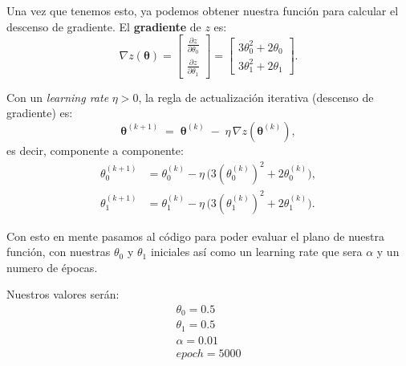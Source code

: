 \documentclass{iopjournal}
\begin{document}
Una vez que tenemos esto, ya podemos obtener nuestra función para calcular el descenso de gradiente.
El \textbf{gradiente} de $z$ es:
\begin{equation}
\nabla z(\boldsymbol{\theta}) =
\begin{bmatrix}
\frac{\partial z}{\partial \theta_0} \\
\frac{\partial z}{\partial \theta_1}
\end{bmatrix}
=
\begin{bmatrix}
3\theta_0^2 + 2\theta_0 \\
3\theta_1^2 + 2\theta_1
\end{bmatrix}.
\label{eq:grad}
\end{equation}

Con un \textit{learning rate} $\eta>0$, la regla de actualización iterativa (descenso de gradiente) es:
\begin{equation}
\boldsymbol{\theta}^{(k+1)} \;=\; \boldsymbol{\theta}^{(k)} \;-\; \eta \,\nabla z\!\left(\boldsymbol{\theta}^{(k)}\right),
\label{eq:gd_update}
\end{equation}
es decir, componente a componente:
\begin{align}
\theta_0^{(k+1)} &= \theta_0^{(k)} - \eta\,\big(3(\theta_0^{(k)})^2 + 2\theta_0^{(k)}\big), \\
\theta_1^{(k+1)} &= \theta_1^{(k)} - \eta\,\big(3(\theta_1^{(k)})^2 + 2\theta_1^{(k)}\big).
\end{align}

Con esto en mente pasamos al código para poder evaluar el plano de nuestra función, con nuestras $\theta_0$ y $\theta_1$ iniciales así como un learning rate que sera $\alpha$ y un numero de épocas.

Nuestros valores serán:
\begin{equation}\label{condiciones_iniciales}
    \begin{aligned}
        \theta_0 = 0.5 \\
        \theta_1 = 0.5 \\
        \alpha = 0.01 \\
        epoch = 5000
    \end{aligned}
\end{equation}
\end{document}
